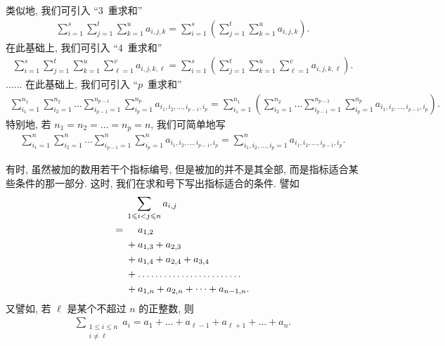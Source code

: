 \documentclass[%
    UTF8,%
    fontset=none,%
    punct=kaiming,%
    zihao=-4,%
    a4paper,%
    oneside,%
]{ctexbook}
\renewcommand*{\leq}{\leqslant}
\begin{document}
类似地, 我们可引入 ``\(3\)~重求和''
\begin{align*}
    \sum_{i = 1}^{s} {
    \sum_{j = 1}^{t} {
    \sum_{k = 1}^{u} {
    a_{i,j,k}}}}
    =
    \sum_{i = 1}^{s}
    {\left( \sum_{j = 1}^{t} {
        \sum_{k = 1}^{u} {
            a_{i,j,k} }} \right)}.
\end{align*}
在此基础上, 我们可引入 ``\(4\)~重求和''
\begin{align*}
    \sum_{i = 1}^{s} {
    \sum_{j = 1}^{t} {
    \sum_{k = 1}^{u} {
    \sum_{\ell = 1}^{v} {
    a_{i,j,k,\ell} }}}}
    =
    \sum_{i = 1}^{s}
    {\left(
    \sum_{j = 1}^{t} {
        \sum_{k = 1}^{u} {
            \sum_{\ell = 1}^{v} {
                a_{i,j,k,\ell} }}}
    \right)}.
\end{align*}
\(\dots \dots\)
在此基础上, 我们可引入 ``\(p\)~重求和''
\begin{align*}
    \sum_{i_1 = 1}^{n_1} {
    \sum_{i_2 = 1}^{n_2} {
    \dots
    \sum_{i_{p-1} = 1}^{n_{p-1}} {
    \sum_{i_p = 1}^{n_p} {
    a_{i_1,i_2,\dots,i_{p-1},i_p} }}}}
    = \sum_{i_1 = 1}^{n_1}
    {\left(
    \sum_{i_2 = 1}^{n_2} {
        \dots
        \sum_{i_{p-1} = 1}^{n_{p-1}} {
            \sum_{i_p = 1}^{n_p} {
                a_{i_1,i_2,\dots,i_{p-1},i_p}}}}
    \right)}.
\end{align*}
特别地, 若 \(n_1 = n_2 = \dots = n_p = n\),
我们可简单地写
\begin{align*}
    \sum_{i_1 = 1}^{n} {
    \sum_{i_2 = 1}^{n} {
    \dots
    \sum_{i_{p-1} = 1}^{n} {
    \sum_{i_p = 1}^{n} {
    a_{i_1,i_2,\dots,i_{p-1},i_p} }}}}
    =
    \sum_{i_1,i_2,\dots,i_p = 1}^{n}
    {a_{i_1,i_2,\dots,i_{p-1},i_p}}.
\end{align*}

有时, 虽然被加的数用若干个指标编号,
但是被加的并不是其全部,
而是指标适合某些条件的那一部分.
这时, 我们在求和号下写出指标适合的条件.
譬如
\begin{align*}
         & \sum_{1 \leq i < j \leq n} {a_{i,j}}
    \\
    = {} & \hphantom{{} + {}} a_{1,2}
    \\
         & + a_{1,3} + a_{2,3}
    \\
         & + a_{1,4} + a_{2,4} + a_{3,4}
    \\
         & +
    \dots \dots \dots \dots
    \dots \dots \dots \dots
    \\
         & + a_{1,n} + a_{2,n} + \dots + a_{n-1,n}.
\end{align*}
又譬如, 若 \(\ell\) 是某个不超过 \(n\) 的正整数, 则
\begin{align*}
    \sum_{\substack{1 \leq i \leq n \\i \neq \ell}}
    {a_i}
    = a_1 + \dots + a_{\ell-1} + a_{\ell+1} + \dots + a_n.
\end{align*}
\end{document}
